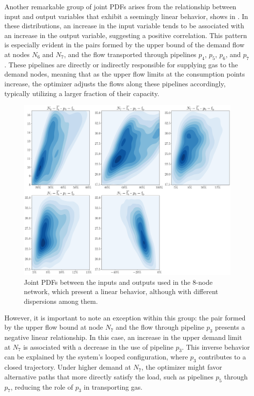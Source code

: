 Another remarkable group of joint PDFs arises from the relationship between input and output variables that exhibit a seemingly linear behavior, shows in . In these distributions, an increase in the input variable tends to be associated with an increase in the output variable, suggesting a positive correlation. This pattern is especially evident in the pairs formed by the upper bound of the demand flow at nodes $N_6$ and $N_7$, and the flow transported through pipelines $p_4$, $p_5$, $p_6$, and $p_7$. These pipelines are directly or indirectly responsible for supplying gas to the demand nodes, meaning that as the upper flow limits at the consumption points increase, the optimizer adjusts the flows along these pipelines accordingly, typically utilizing a larger fraction of their capacity. 

\begin{figure}[htbp]
    \begin{center}
        \includegraphics[width=.7\textwidth]{figures/Chapter_NonLinealCensnet/inputs_outputs_2.png}
    \end{center}
    \caption{Joint PDFs between the inputs and outputs used in the 8-node network, which present a linear behavior, although with different dispersions among them. }\label{fig:joint_distributions_inputs_outputs_2}
\end{figure}
 
However, it is important to note an exception within this group: the pair formed by the upper flow bound at node $N_7$ and the flow through pipeline $p_3$ presents a negative linear relationship. In this case, an increase in the upper demand limit at $N_7$ is associated with a decrease in the use of pipeline $p_3$. This inverse behavior can be explained by the system's looped configuration, where $p_3$ contributes to a closed trajectory. Under higher demand at $N_7$, the optimizer might favor alternative paths that more directly satisfy the load, such as pipelines $p_5$ through $p_7$, reducing the role of $p_3$ in transporting gas.



